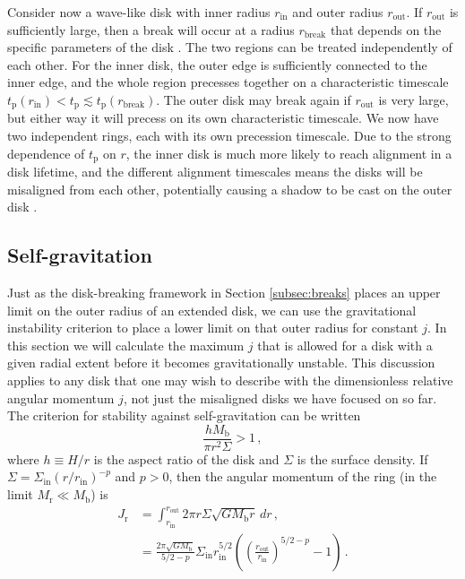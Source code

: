 \documentclass[twocolumn]{aastex631}
\newcommand{\TJ}[1]{\textcolor{orange}{#1}}
\begin{document}
Consider now a wave-like disk with inner radius $r_\text{in}$ and outer radius $r_\text{out}$. If $r_\text{out}$ is sufficiently large, then a break will occur at a radius $r_\text{break}$ that depends on the specific parameters of the disk \citep[see][eq. (9)]{rabago2024}. The two regions can be treated independently of each other. For the inner disk, the outer edge is sufficiently connected to the inner edge, and the whole region precesses together on a characteristic timescale $t_\text{p}(r_\text{in}) < t_\text{p} \lesssim t_\text{p}(r_\text{break})$. The outer disk may break again if $r_\text{out}$ is very large, but either way it will precess on its own characteristic timescale. We now have two independent rings, each with its own precession timescale. Due to the strong dependence of $t_\text{p}$ on $r$, the inner disk is much more likely to reach alignment in a disk lifetime, and the different alignment timescales means the disks will be misaligned from each other, potentially causing a shadow to be cast on the outer disk \citep[see][\TJ{and others}]{benisty2023,su2024,zhang2024}.

\subsection{Self-gravitation}
\label{subsec:toomre}
Just as the disk-breaking framework in Section \ref{subsec:breaks} places an upper limit on the outer radius of an extended disk, we can use the gravitational instability criterion to place a lower limit on that outer radius for constant $j$. In this section we will calculate the maximum $j$ that is allowed for a disk with a given radial extent before it becomes gravitationally unstable. This discussion applies to any disk that one may wish to describe with the dimensionless relative angular momentum $j$, not just the misaligned disks we have focused on so far. The criterion for stability against self-gravitation \citep{toomre1964} can be written
\begin{equation}
    \label{eq:toomre}
    \frac{hM_\text{b}}{\pi r^2 \Sigma} > 1\, ,
\end{equation}
where $h\equiv H/r$ is the aspect ratio of the disk and $\Sigma$ is the surface density. If $\Sigma = \Sigma_\text{in} (r/r_\text{in})^{-p}$ and $p>0$, then the angular momentum of the ring (in the limit $M_\text{r} \ll M_\text{b}$) is
\begin{align}
    J_\text{r} &= \int_{r_\text{in}}^{r_\text{out}} 2\pi r \Sigma  \sqrt{GM_\text{b}r}\,dr \, , \nonumber \\
    & = \frac{2\pi\sqrt{GM_\text{b}}}{5/2 - p} \Sigma_\text{in} r_\text{in}^{5/2} \left( \left( \frac{r_\text{out}}{r_\text{in}} \right)^{5/2 - p}- 1\right)\, \label{eq:Jr}.
\end{align}
\end{document}
